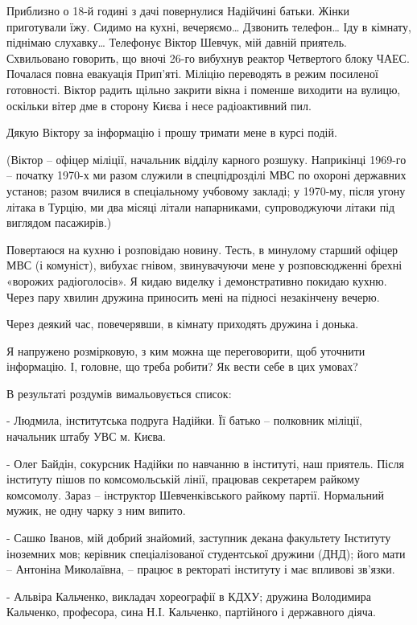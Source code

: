 Приблизно о 18-й годині з дачі повернулися Надійчині батьки. Жінки приготували
їжу. Сидимо на кухні, вечеряємо… Дзвонить телефон… Іду в кімнату, піднімаю
слухавку… Телефонує Віктор Шевчук, мій давній приятель. Схвильовано говорить,
що вночі 26-го вибухнув реактор Четвертого блоку ЧАЕС. Почалася повна евакуація
Прип’яті. Міліцію переводять в режим посиленої готовності. Віктор радить щільно
закрити вікна і поменше виходити на вулицю, оскільки вітер дме в сторону Києва
і несе радіоактивний пил. 

Дякую Віктору за інформацію і прошу тримати мене в курсі подій.

(Віктор – офіцер міліції, начальник відділу карного розшуку. Наприкінці 1969-го
– початку 1970-х ми разом служили в спецпідрозділі МВС по охороні державних
установ; разом вчилися в спеціальному учбовому закладі; у 1970-му, після угону
літака в Турцію, ми два місяці літали напарниками, супроводжуючи літаки під
виглядом пасажирів.) 

Повертаюся на кухню і розповідаю новину. Тесть, в минулому старший офіцер МВС
(і комуніст), вибухає гнівом, звинувачуючи мене у розповсюдженні брехні
«ворожих радіоголосів». Я кидаю виделку і демонстративно покидаю кухню. Через
пару хвилин дружина приносить мені на підносі незакінчену вечерю.

Через деякий час, повечерявши, в кімнату приходять дружина і донька. 

Я напружено розмірковую, з ким можна ще переговорити, щоб уточнити інформацію.
І, головне, що треба робити? Як вести себе в цих умовах?

В результаті роздумів вимальовується список:

- Людмила, інститутська подруга Надійки. Її батько – полковник міліції,
начальник штабу УВС м. Києва.

- Олег Байдін, сокурсник Надійки по навчанню в інституті, наш приятель. Після
інституту пішов по комсомольській лінії, працював секретарем райкому комсомолу.
Зараз – інструктор Шевченківського райкому партії. Нормальний мужик, не одну
чарку з ним випито. 

- Сашко Іванов, мій добрий знайомий, заступник декана факультету Інституту
іноземних мов; керівник спеціалізованої студентської дружини (ДНД); його мати –
Антоніна Миколаївна, – працює в ректораті інституту і має впливові зв’язки.

- Альвіра Кальченко, викладач хореографії в КДХУ; дружина Володимира Кальченко,
професора, сина Н.І. Кальченко, партійного і державного діяча.

